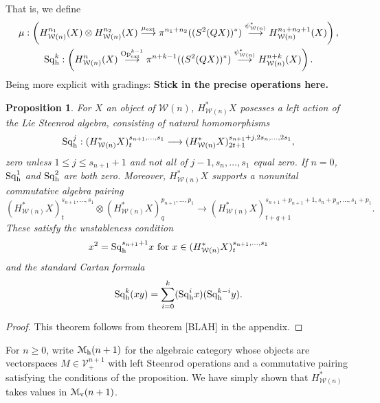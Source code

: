 \documentclass[11pt]{amsart}
\theoremstyle{plain}
\newtheorem{prop}[thm]{Proposition}
\theoremstyle{definition}
\renewcommand{\to}{\longrightarrow}
\newcommand{\calW}{\mathcal{W}}
\newcommand{\calV}{\mathcal{V}}
\newcommand{\calM}{\mathcal{M}}
\theoremstyle{plain}
\newcommand{\vect}[2]{\calV^{#1}_{#2}}
\newcommand{\ExtCohOp}{\textup{Op}_\textup{ext}}
\newcommand{\ExtCohProd}{\mu_\textup{ext}}
\newcommand{\Sq}{\mathrm{Sq}}
\begin{document}
\begin{Cohomology operations for all unstable Lie algebras}
That is, we define
\begin{gather*}
\mu:\left(H_{\calW(n)}^{n_1}(X)\otimes H_{\calW(n)}^{n_2}(X)\overset{\ExtCohProd}{\to} \pi^{n_1+n_2}((S^2(QX))^*)\overset{\psi_{\calW(n)}^*}{\to} H_{\calW(n)}^{n_1+n_2+1}(X)\right),\\
\Sq^k_\textup{h}:\left(H_{\calW(n)}^{n}(X)\overset{\ExtCohOp^{k-1}}{\to} \pi^{n+k-1}((S^2(QX))^*)\overset{\psi_{\calW(n)}^*}{\to} H_{\calW(n)}^{n+k}(X)\right).
\end{gather*}
Being more explicit with gradings:
\textbf{Stick in the precise operations here.}

\begin{prop}
For $X$ an object of $\calW(n)$, $H^*_{\calW(n)}X$ posesses a left action of the Lie Steenrod algebra, consisting of natural homomorphisms
\[\Sq^j_\textup{h}:(H^*_{\calW(n)}X)_t^{s_{n+1},\ldots,s_1}\to (H^*_{\calW(n)}X)_{2t+1}^{s_{n+1}+j,2s_{n},\ldots,2s_1},\]
zero unless $1\leq j\leq s_{n+1}+1$ and not all of $j-1,s_{n},\ldots,s_1$ equal zero. If $n=0$, $\Sq_\textup{h}^1$ and $\Sq^2_\textup{h}$ are both zero.  Moreover, $H^*_{\calW(n)}X$ supports a nonunital commutative algebra pairing
\[(H^*_{\calW(n)}X)_t^{s_{n+1},\ldots,s_1}\otimes (H^*_{\calW(n)}X)_q^{p_{n+1},\ldots,p_1}\to (H^*_{\calW(n)}X)_{t+q+1}^{s_{n+1}+p_{n+1}+1,s_{n}+p_{n},\ldots,s_1+p_1}.\]
These satisfy the unstableness condition
\[x^2=\Sq^{s_{n+1}+1}_\textup{h}x\text{ for }x\in (H^*_{\calW(n)}X)_t^{s_{n+1},\ldots,s_1}\]
and the standard Cartan formula
\[\Sq^k_\textup{h}(xy)=\sum_{i=0}^k(\Sq^i_\textup{h}x)(\Sq^{k-i}_\textup{h}y).\]
\end{prop}
\begin{proof}
This theorem follows from theorem [BLAH] in the appendix.
\end{proof}
For $n\geq0$, write $\calM_\textup{h}(n+1)$ for the algebraic category whose objects are vectorspaces $M\in\vect{n+1}{+}$ with left Steenrod operations and a commutative pairing satisfying the conditions of the proposition. We have simply shown that $H^*_{\calW(n)}$ takes values in $\calM_\textup{v}(n+1)$.


\end{Cohomology operations for all unstable Lie algebras}
\end{document}
